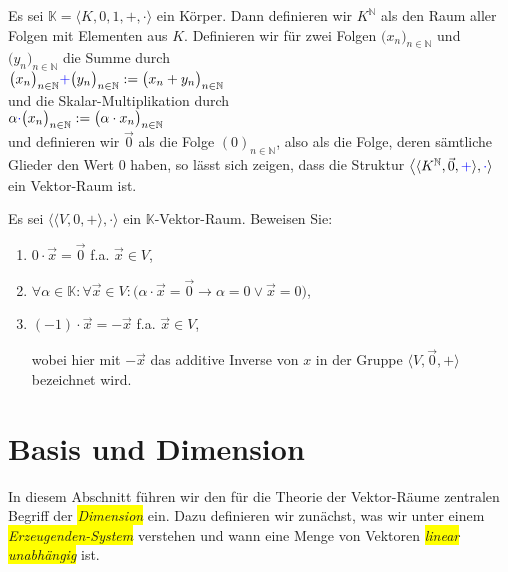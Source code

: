 \example
Es sei $\mathbb{K} = \langle K, 0,1,+,\cdot\rangle$ ein K\"{o}rper.  Dann definieren wir $K^\mathbb{N}$ als den Raum aller
Folgen mit Elementen aus $K$.  Definieren wir f\"{u}r zwei
Folgen
$\bigl(x_n\bigr)_{n\in\mathbb{N}}$ und $\bigl(y_n\bigr)_{n\in\mathbb{N}}$ die Summe durch
\\[0.2cm]
\hspace*{1.3cm}
$\bigl(x_n\bigr)_{n\in\mathbb{N}} {\color{blue}{+}} \bigl(y_n\bigr)_{n\in\mathbb{N}} := \bigl(x_n + y_n\bigr)_{n\in\mathbb{N}}$ 
\\[0.2cm]
und die Skalar-Multiplikation durch
\\[0.2cm]
\hspace*{1.3cm}
$\alpha {\color{blue}{\cdot}} \bigl(x_n\bigr)_{n\in\mathbb{N}} := \bigl(\alpha \cdot x_n \bigr)_{n\in\mathbb{N}}$
\\[0.2cm]
und definieren wir $\vec{0}$ als die Folge $(0)_{n\in\mathbb{N}}$, also als die Folge,
deren s\"{a}mtliche Glieder den Wert $0$ haben, so l\"{a}sst sich zeigen, dass die Struktur
 $\bigl\langle\langle K^\mathbb{N}, \vec{0}, {\color{blue}{+}}\rangle, {\color{blue}{\cdot}}\rangle$  ein Vektor-Raum ist.
\eox


\exercise
Es sei $\bigl\langle \langle V, 0, +\rangle, \cdot\bigr\rangle$ ein $\mathbb{K}$-Vektor-Raum.  Beweisen Sie:
\renewcommand{\labelenumi}{(\alph{enumi})}
\begin{enumerate}
\item $0 \cdot \vec{x} = \vec{0}$ \quad f.a. $\vec{x} \in V$,
\item $\forall \alpha \in \mathbb{K}: \forall \vec{x} \in V: \bigl(\alpha \cdot \vec{x} = \vec{0} \rightarrow \alpha = 0 \vee \vec{x} = 0\bigr)$,
\item $(-1) \cdot \vec{x} = -\vec{x}$ \quad f.a. $\vec{x} \in V$,

      wobei hier mit $-\vec{x}$ das additive Inverse von $x$ in der Gruppe $\langle V, \vec{0}, +\rangle$
      bezeichnet wird. 
      \eoxs
\end{enumerate}
\renewcommand{\labelenumi}{\arabic{enumi}.}

\section{Basis und Dimension}
In diesem Abschnitt f\"{u}hren wir den f\"{u}r die Theorie der Vektor-R\"{a}ume zentralen Begriff
der \colorbox{yellow}{\emph{Dimension}}
ein.  Dazu definieren wir zun\"{a}chst, was wir unter einem \colorbox{yellow}{\emph{Erzeugenden-System}}
verstehen und wann eine Menge von Vektoren \colorbox{yellow}{\emph{linear unabh\"{a}ngig}} ist.

